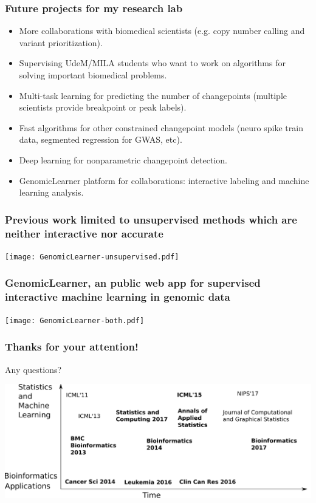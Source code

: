 \documentclass{beamer}
\begin{document}
\begin{frame}
  \frametitle{Future projects for my research lab}
  \begin{itemize}
  \item More collaborations with biomedical scientists (e.g. copy
    number calling and variant prioritization).
  \item Supervising UdeM/MILA students who want to work on algorithms
    for solving important biomedical problems.
  \item Multi-task learning for predicting the number of changepoints
    (multiple scientists provide breakpoint or peak labels).
  \item Fast algorithms for other constrained changepoint models
    (neuro spike train data, segmented regression for GWAS, etc).
  \item Deep learning for nonparametric changepoint detection.
  \item GenomicLearner platform for collaborations: interactive
    labeling and machine learning analysis.
  \end{itemize}
\end{frame}

\begin{frame}
  \frametitle{Previous work limited to 
    unsupervised methods
which are neither interactive nor accurate
}
  \texttt{[image: GenomicLearner-unsupervised.pdf]}
\end{frame}

\begin{frame}
  \frametitle{GenomicLearner, an public web app for supervised interactive machine learning in genomic data}
  \texttt{[image: GenomicLearner-both.pdf]}
\end{frame}


\begin{frame}
  \frametitle{Thanks for your attention!}

Any questions?

\hskip 1cm

\includegraphics[width=\textwidth]{timeline-SteJustine}




\end{frame}
\end{document}
